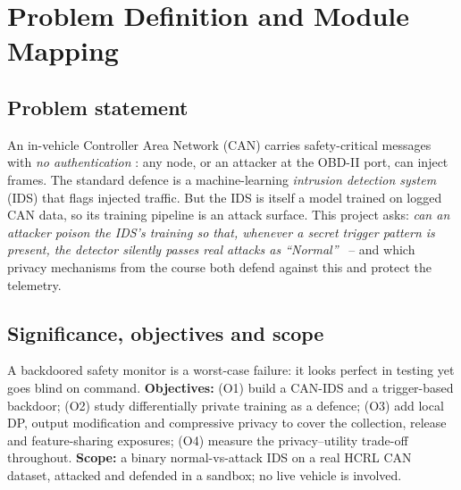 \documentclass[11pt,a4paper]{article}
\begin{document}
\section{Problem Definition and Module Mapping}\label{sec:prob}
\subsection{Problem statement}
An in-vehicle Controller Area Network (CAN) carries safety-critical messages with
\emph{no authentication} \citep{koscher2010experimental}: any node, or an attacker
at the OBD-II port, can inject frames. The standard defence is a machine-learning
\emph{intrusion detection system} (IDS) that flags injected traffic. But the IDS
is itself a model trained on logged CAN data, so its training pipeline is an
attack surface. This project asks: \emph{can an attacker poison the IDS's training
so that, whenever a secret trigger pattern is present, the detector silently
passes real attacks as ``Normal''}~\citep{gu2017badnets} -- and which privacy
mechanisms from the course both defend against this and protect the telemetry.

\subsection{Significance, objectives and scope}
A backdoored safety monitor is a worst-case failure: it looks perfect in testing
yet goes blind on command. \textbf{Objectives:} (O1) build a CAN-IDS and a
trigger-based backdoor; (O2) study differentially private training as a defence;
(O3) add local DP, output modification and compressive privacy to cover the
collection, release and feature-sharing exposures; (O4) measure the
privacy--utility trade-off throughout. \textbf{Scope:} a binary normal-vs-attack
IDS on a real HCRL CAN dataset, attacked and defended in a sandbox; no live
vehicle is involved.
\end{document}
